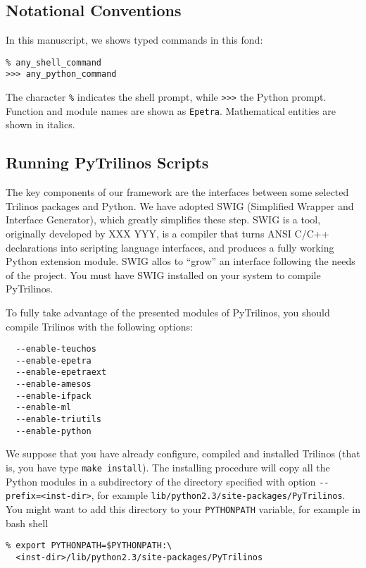 \documentclass[10pt,relax]{SANDreport}
\newcommand{\PyTrilinos}{{PyTrilinos}}
\begin{document}
\subsection{Notational Conventions}
\label{sec:notational}

In this manuscript, we shows typed commands in this fond:
\begin{verbatim}
% any_shell_command
>>> any_python_command
\end{verbatim}
The character \verb!%! indicates the shell prompt, while \verb!>>>! the Python
prompt. Function and module names are shown as \verb!Epetra!. Mathematical
entities are shown in italics.

\subsection{Running PyTrilinos Scripts}
\label{sec:running}

The key components of our framework are the interfaces between some selected
Trilinos packages and Python. We have adopted SWIG 
(Simplified Wrapper and Interface Generator), which greatly simplifies these
step. SWIG is a tool, originally developed by XXX YYY, is a compiler that
turns ANSI C/C++ declarations into scripting language interfaces, and produces
a fully working Python extension module. SWIG allos to ``grow'' an interface
following the needs of the project.  You must have SWIG installed on your
system to compile PyTrilinos.

To fully take advantage of the presented modules of \PyTrilinos, you should
compile Trilinos with the following options:
\begin{verbatim}
  --enable-teuchos    
  --enable-epetra     
  --enable-epetraext  
  --enable-amesos    
  --enable-ifpack     
  --enable-ml         
  --enable-triutils   
  --enable-python
\end{verbatim}
We suppose that you have already configure, compiled and installed Trilinos 
(that is, you have type \verb!make install!).
The installing procedure will copy all the Python modules in a subdirectory of
the directory specified with option \verb!--prefix=<inst-dir>!, for example
\verb!lib/python2.3/site-packages/PyTrilinos!. You might want to add this
directory to your \verb!PYTHONPATH! variable, for example in bash shell
\begin{verbatim}
% export PYTHONPATH=$PYTHONPATH:\
  <inst-dir>/lib/python2.3/site-packages/PyTrilinos
\end{verbatim}
\end{document}
